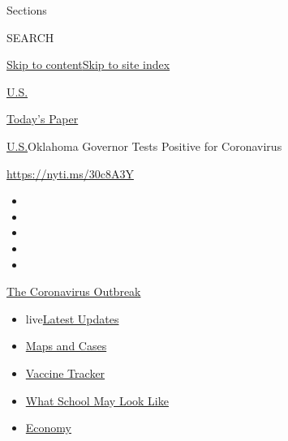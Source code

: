 Sections

SEARCH

\protect\hyperlink{site-content}{Skip to
content}\protect\hyperlink{site-index}{Skip to site index}

\href{https://www.nytimes.com/section/us}{U.S.}

\href{https://myaccount.nytimes.com/auth/login?response_type=cookie\&client_id=vi}{}

\href{https://www.nytimes.com/section/todayspaper}{Today's Paper}

\href{/section/us}{U.S.}\textbar{}Oklahoma Governor Tests Positive for
Coronavirus

\url{https://nyti.ms/30c8A3Y}

\begin{itemize}
\item
\item
\item
\item
\item
\end{itemize}

\href{https://www.nytimes.com/news-event/coronavirus?action=click\&pgtype=Article\&state=default\&region=TOP_BANNER\&context=storylines_menu}{The
Coronavirus Outbreak}

\begin{itemize}
\tightlist
\item
  live\href{https://www.nytimes.com/2020/08/01/world/coronavirus-covid-19.html?action=click\&pgtype=Article\&state=default\&region=TOP_BANNER\&context=storylines_menu}{Latest
  Updates}
\item
  \href{https://www.nytimes.com/interactive/2020/us/coronavirus-us-cases.html?action=click\&pgtype=Article\&state=default\&region=TOP_BANNER\&context=storylines_menu}{Maps
  and Cases}
\item
  \href{https://www.nytimes.com/interactive/2020/science/coronavirus-vaccine-tracker.html?action=click\&pgtype=Article\&state=default\&region=TOP_BANNER\&context=storylines_menu}{Vaccine
  Tracker}
\item
  \href{https://www.nytimes.com/interactive/2020/07/29/us/schools-reopening-coronavirus.html?action=click\&pgtype=Article\&state=default\&region=TOP_BANNER\&context=storylines_menu}{What
  School May Look Like}
\item
  \href{https://www.nytimes.com/live/2020/07/31/business/stock-market-today-coronavirus?action=click\&pgtype=Article\&state=default\&region=TOP_BANNER\&context=storylines_menu}{Economy}
\end{itemize}

